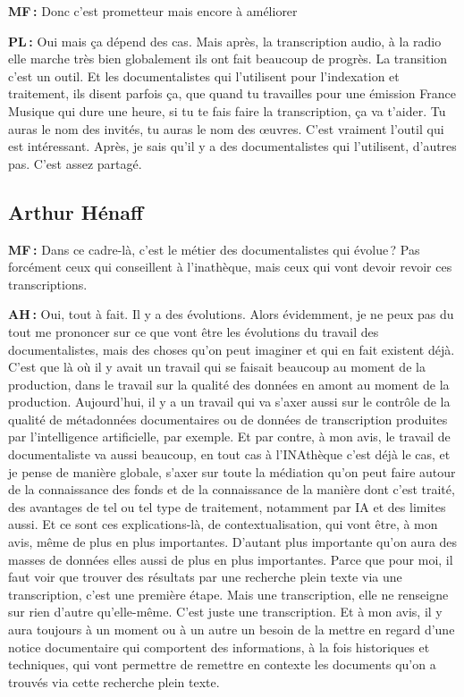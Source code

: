 \textbf{MF :} Donc c'est prometteur mais encore à améliorer 

\textbf{PL :} Oui mais ça dépend des cas. Mais après, la transcription audio, à la radio elle marche très bien globalement ils ont fait beaucoup de progrès. La transition c'est un outil. Et les documentalistes qui l'utilisent pour l’indexation et traitement, ils disent parfois ça, que quand tu travailles pour une émission France Musique qui dure une heure, si tu te fais faire la transcription, ça va t'aider. Tu auras le nom des invités, tu auras le nom des œuvres. C'est vraiment l'outil qui est intéressant. Après, je sais qu'il y a des documentalistes qui l'utilisent, d'autres pas. C'est assez partagé. 

\subsection*{Arthur Hénaff}

\textbf{MF :} Dans ce cadre-là, c'est le métier des documentalistes qui évolue ? Pas forcément ceux qui conseillent à l’inathèque, mais ceux qui vont devoir revoir ces transcriptions. 

\textbf{AH :} Oui, tout à fait. Il y a des évolutions. Alors évidemment, je ne peux pas du tout me prononcer sur ce que vont être les évolutions du travail des documentalistes, mais des choses qu'on peut imaginer et qui en fait existent déjà. C'est que là où il y avait un travail qui se faisait beaucoup au moment de la production, dans le travail sur la qualité des données en amont au moment de la production. Aujourd'hui, il y a un travail qui va s'axer aussi sur le contrôle de la qualité de métadonnées documentaires ou de données de transcription produites par l'intelligence artificielle, par exemple.  Et par contre, à mon avis, le travail de documentaliste va aussi beaucoup, en tout cas à l’INAthèque c'est déjà le cas, et je pense de manière globale, s'axer sur toute la médiation qu'on peut faire autour de la connaissance des fonds et de la connaissance de la manière dont c'est traité, des avantages de tel ou tel type de traitement, notamment par IA et des limites aussi. Et ce sont ces explications-là, de contextualisation, qui vont être, à mon avis, même de plus en plus importantes. D’autant plus importante qu'on aura des masses de données elles aussi de plus en plus importantes. Parce que pour moi, il faut voir que trouver des résultats par une recherche plein texte via une transcription, c'est une première étape. Mais une transcription, elle ne renseigne sur rien d'autre qu'elle-même. C'est juste une transcription.  Et à mon avis, il y aura toujours à un moment ou à un autre un besoin de la mettre en regard d'une notice documentaire qui comportent des informations, à la fois historiques et techniques, qui vont permettre de remettre en contexte les documents qu'on a trouvés via cette recherche plein texte.

